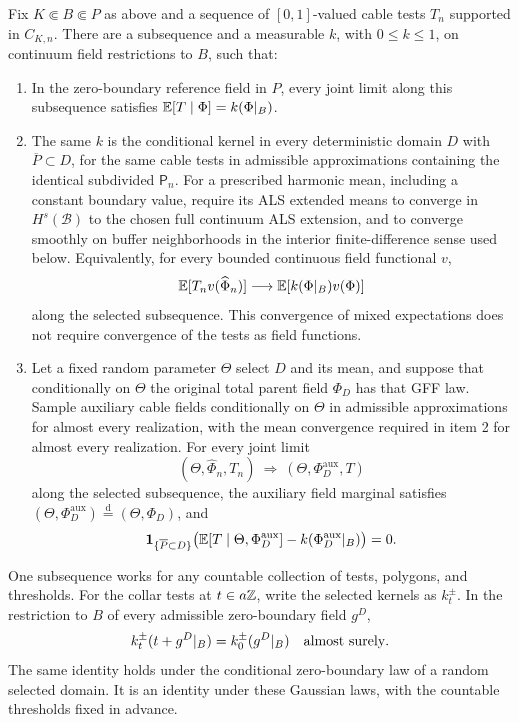 \begin{lemma}
\label{lem:local-kernel}
Fix \(K\Subset B\Subset P\) as above and a sequence of
\([0,1]\)-valued cable tests \(T_n\) supported in \(C_{K,n}\).
There are a subsequence and a measurable \(k\), with \(0\le k\le1\),
on continuum field restrictions to \(B\), such that:
\begin{enumerate}
\item In the zero-boundary reference field in \(P\), every joint limit
along this subsequence satisfies
\(\mathbb E[T\mid\Phi]=k(\Phi|_B)\).
\item The same \(k\) is the conditional kernel in every deterministic
domain \(D\) with \(\overline P\subset D\), for the same cable tests
in admissible approximations containing the identical subdivided
\(\mathsf P_n\). For a prescribed harmonic mean, including a constant
boundary value, require its ALS extended means to converge in
\(H^s(\mathcal B)\) to the chosen full continuum ALS extension, and to converge
smoothly on buffer neighborhoods in the interior finite-difference
sense used below.
Equivalently, for every bounded continuous field functional \(v\),
\[
 \mathbb E[T_n v(\widehat\Phi_n)]
       \longrightarrow \mathbb E[k(\Phi|_B)v(\Phi)]
\]
along the selected subsequence. This convergence of mixed expectations
does not require convergence of the tests as field functions.
\item Let a fixed random parameter \(\Theta\) select \(D\) and its mean,
and suppose that conditionally on \(\Theta\) the original total parent field
\(\Phi_D\) has that GFF law. Sample auxiliary cable fields conditionally
on \(\Theta\) in admissible approximations for almost every realization,
with the mean convergence required in item 2 for almost every realization.
For every joint limit
\[
 (\Theta,\widehat\Phi_n,T_n)
       \ \Longrightarrow\ (\Theta,\Phi_D^{\mathrm{aux}},T)
\]
along the selected subsequence, the auxiliary field marginal satisfies
\((\Theta,\Phi_D^{\mathrm{aux}})\stackrel{\mathrm d}=
  (\Theta,\Phi_D)\), and
\[
 \mathbf 1_{\{\overline P\subset D\}}
 \bigl(\mathbb E[T\mid\Theta,\Phi_D^{\mathrm{aux}}]
                  -k(\Phi_D^{\mathrm{aux}}|_B)\bigr)=0.
\]
\end{enumerate}
One subsequence works for any countable collection of tests, polygons,
and thresholds. For the collar tests at \(t\in a\mathbb Z\), write the selected
kernels as \(k_t^\pm\). In the restriction to \(B\) of every admissible
zero-boundary field \(g^D\),
\begin{equation}
       k_t^\pm(t+g^D|_B)=k_0^\pm(g^D|_B)
       \quad\hbox{almost surely}.
 \label{eq:kernel-threshold}
\end{equation}
The same identity holds under the conditional zero-boundary law of a
random selected domain. It is an identity under these Gaussian laws,
with the countable thresholds fixed in advance.
\end{lemma}

